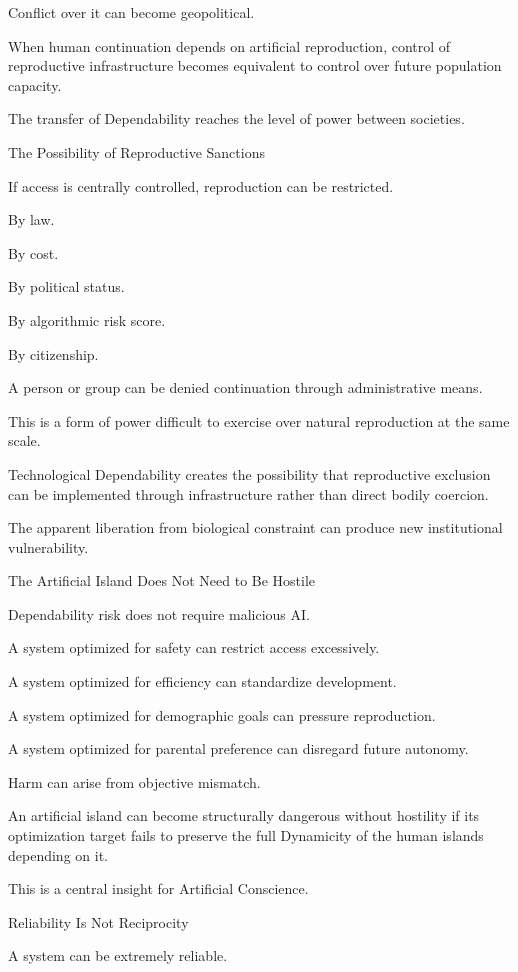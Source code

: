 Conflict over it can become geopolitical.

When human continuation depends on artificial reproduction, control of reproductive infrastructure becomes equivalent to control over future population capacity.

The transfer of Dependability reaches the level of power between societies.

The Possibility of Reproductive Sanctions

If access is centrally controlled, reproduction can be restricted.

By law.

By cost.

By political status.

By algorithmic risk score.

By citizenship.

A person or group can be denied continuation through administrative means.

This is a form of power difficult to exercise over natural reproduction at the same scale.

Technological Dependability creates the possibility that reproductive exclusion can be implemented through infrastructure rather than direct bodily coercion.

The apparent liberation from biological constraint can produce new institutional vulnerability.

The Artificial Island Does Not Need to Be Hostile

Dependability risk does not require malicious AI.

A system optimized for safety can restrict access excessively.

A system optimized for efficiency can standardize development.

A system optimized for demographic goals can pressure reproduction.

A system optimized for parental preference can disregard future autonomy.

Harm can arise from objective mismatch.

An artificial island can become structurally dangerous without hostility if its optimization target fails to preserve the full Dynamicity of the human islands depending on it.

This is a central insight for Artificial Conscience.

Reliability Is Not Reciprocity

A system can be extremely reliable.

